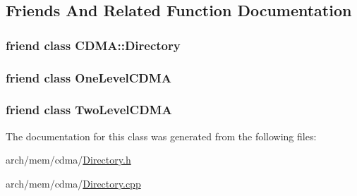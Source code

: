 \subsection{Friends And Related Function Documentation}
\hypertarget{class_simulator_1_1_c_d_m_a_1_1_directory_bottom_a4af5f54393d68421df7d6c951208e049}{
\subsubsection[{C\+D\+M\+A\+::\+Directory}]{\setlength{\rightskip}{0pt plus 5cm}friend class {\bf C\+D\+M\+A\+::\+Directory}\hspace{0.3cm}{\ttfamily [friend]}}}\label{class_simulator_1_1_c_d_m_a_1_1_directory_bottom_a4af5f54393d68421df7d6c951208e049}
\hypertarget{class_simulator_1_1_c_d_m_a_1_1_directory_bottom_a97f5acb405692cb3363f4beb4f2dd45d}{
\subsubsection[{One\+Level\+C\+D\+M\+A}]{\setlength{\rightskip}{0pt plus 5cm}friend class {\bf One\+Level\+C\+D\+M\+A}\hspace{0.3cm}{\ttfamily [friend]}}}\label{class_simulator_1_1_c_d_m_a_1_1_directory_bottom_a97f5acb405692cb3363f4beb4f2dd45d}
\hypertarget{class_simulator_1_1_c_d_m_a_1_1_directory_bottom_a25bd9aa1e243b7f4e894dcc62a8a715a}{
\subsubsection[{Two\+Level\+C\+D\+M\+A}]{\setlength{\rightskip}{0pt plus 5cm}friend class {\bf Two\+Level\+C\+D\+M\+A}\hspace{0.3cm}{\ttfamily [friend]}}}\label{class_simulator_1_1_c_d_m_a_1_1_directory_bottom_a25bd9aa1e243b7f4e894dcc62a8a715a}


The documentation for this class was generated from the following files\+:\begin{DoxyCompactItemize}
\item 
arch/mem/cdma/\hyperlink{cdma_2_directory_8h}{Directory.\+h}\item 
arch/mem/cdma/\hyperlink{cdma_2_directory_8cpp}{Directory.\+cpp}\end{DoxyCompactItemize}
